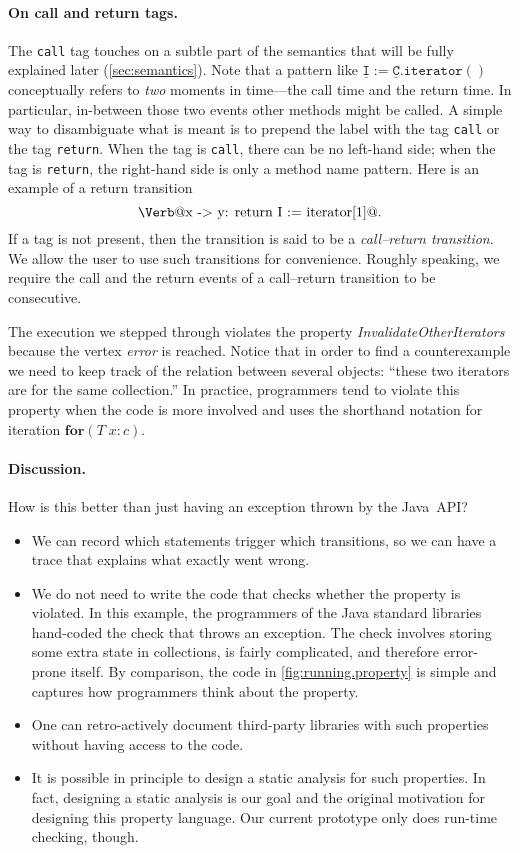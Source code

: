 \documentclass[preprint]{sigplanconf} %
\makeatletter
\newcommand{\dinocomment}[1]{
\begin{center}
\fbox{
\begin{minipage}{3.0in}
{\bf Dino's comment:} {\it #1}
\end{minipage}}
\end{center}}
\newcommand{\verbline}[2][]{\[\text{\Verb@#2@}#1\]}
\newcommand{\pattern}[1]{\mathtt{\underline{#1}}}
\theoremstyle{definition}
\theoremstyle{remark}
\makeatother
\begin{document}
\dinocomment{Move it when the semantics is clear}
\paragraph{On call and return tags.}
The \texttt{call} tag touches on a subtle part of the semantics that will be fully explained later (\autoref{sec:semantics}).
Note that a pattern like $\pattern I:=\pattern C.\mathtt{iterator}()$ conceptually refers to \emph{two} moments in time---the call time and the return time.
In particular, in-between those two events other methods might be called.
A simple way to disambiguate what is meant is to prepend the label with the tag \texttt{call} or the tag \texttt{return}.
When the tag is \texttt{call}, there can be no left-hand side;
when the tag is \texttt{return}, the right-hand side is only a method name pattern.
Here is an example of a return transition \verbline[.]{x -> y: return I := iterator[1]}
If a tag is not present, then the transition is said to be a \emph{call--return transition}.
We allow the user to use such transitions for convenience.
Roughly speaking, we require the call and the return events of a call--return transition to be consecutive.

The execution we stepped through violates the property \textit{InvalidateOtherIterators} because the vertex \textit{error} is reached.
Notice that in order to find a counterexample we need to keep track of the relation between several objects: ``these two iterators are for the same collection.''
In practice, programmers tend to violate this property when the code is more involved and uses the shorthand notation for iteration $\mathbf{for}(T\;x:c)$.

\paragraph{Discussion.}
How is this better than just having an exception thrown by the Java~API\null?
\begin{itemize}
\item We can record which statements trigger which transitions, so we can have a trace that explains what exactly went wrong.
\item We do not need to write the code that checks whether the property is violated.
  In this example, the programmers of the Java standard libraries hand-coded the check that throws an exception.
  The check involves storing some extra state in collections, is fairly complicated, and therefore error-prone itself.
  By comparison, the code in \autoref{fig:running.property} is simple and captures how programmers think about the property.
\item One can retro-actively document third-party libraries with such properties without having access to the code.
\item It is possible in principle to design a static analysis for such properties.
  In fact, designing a static analysis is our goal and the original motivation for designing this property language.
  Our current prototype only does run-time checking, though.
\end{itemize}
\end{document}
